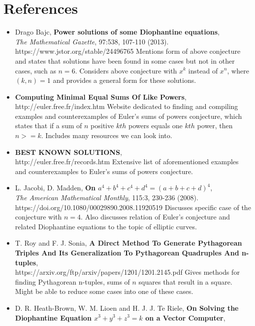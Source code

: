 \documentclass{article}
\begin{document}
\section{References}
\begin{itemize}
    \item Drago Bajc, {\bf Power solutions of some Diophantine equations}, \\
        \textit{The Mathematical Gazette}, 97:538, 107-110 (2013). \\
        https://www.jstor.org/stable/24496765
        \subitem Mentions form of above conjecture and states that solutions have been found in some cases but not in other cases, such as $n=6$. Considers above conjecture with $x^k$ instead of $x^n$, where $(k,n)=1$ and provides a general form for these solutions. 
    \item {\bf Computing Minimal Equal Sums Of Like Powers}, \\
        http://euler.free.fr/index.htm 
        \subitem Website dedicated to finding and compiling examples and counterexamples of Euler's sums of powers conjecture, which states that if a sum of $n$ positive $kth$ powers equals one $kth$ power, then $n>=k$. Includes many resources we can look into. 
    \item {\bf BEST KNOWN SOLUTIONS}, \\
        http://euler.free.fr/records.htm
        \subitem  Extensive list of aforementioned examples and counterexamples to Euler's sums of powers conjecture.
    \item L. Jacobi, D. Madden, {\bf On $a^4 + b^4 + c^4 + d^4=(a+b+c+d)^4$}, \\
        \textit{The American Mathematical Monthly}, 115:3, 230-236 (2008). \\
        https://doi.org/10.1080/00029890.2008.11920519
        \subitem Discusses specific case of the conjecture with $n=4$. Also discusses relation of Euler's conjecture and related Diophantine equations to the topic of elliptic curves. 
    \item T. Roy and F. J. Sonia, {\bf A Direct Method To Generate Pythagorean Triples And Its Generalization To Pythagorean Quadruples And n-tuples},\\ 
    https://arxiv.org/ftp/arxiv/papers/1201/1201.2145.pdf 
        \subitem Gives methods for finding Pythagorean n-tuples, sums of $n$ squares that result in a square. Might be able to reduce some cases into one of these cases. 
    \item D. R. Heath-Brown, W. M. Lioen and H. J. J. Te Riele, {\bf On Solving the Diophantine Equation $x^3 + y^3 + z^3 = k$ on a Vector Computer},\\

\end{itemize}
\end{document}
